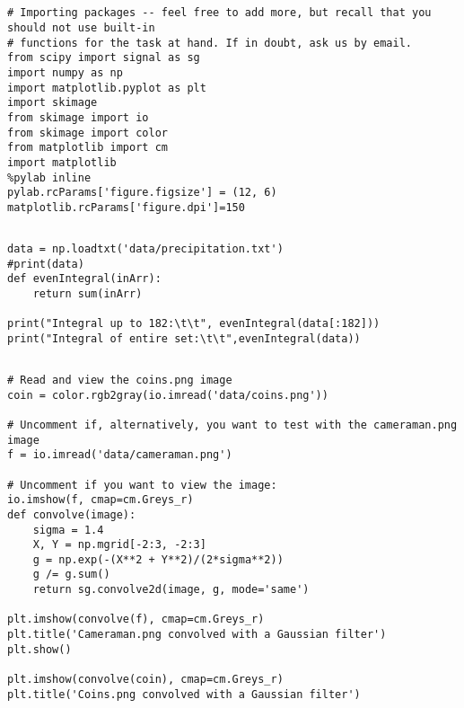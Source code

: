 \subsection{}
\begin{verbatim}
# Importing packages -- feel free to add more, but recall that you should not use built-in 
# functions for the task at hand. If in doubt, ask us by email.
from scipy import signal as sg
import numpy as np
import matplotlib.pyplot as plt
import skimage
from skimage import io
from skimage import color
from matplotlib import cm 
import matplotlib
%pylab inline
pylab.rcParams['figure.figsize'] = (12, 6)
matplotlib.rcParams['figure.dpi']=150
\end{verbatim}

\subsection{}
\begin{verbatim}
data = np.loadtxt('data/precipitation.txt')
#print(data)
def evenIntegral(inArr):
    return sum(inArr)

print("Integral up to 182:\t\t", evenIntegral(data[:182]))
print("Integral of entire set:\t\t",evenIntegral(data))
\end{verbatim}

\subsection{}
\begin{verbatim}
# Read and view the coins.png image
coin = color.rgb2gray(io.imread('data/coins.png'))

# Uncomment if, alternatively, you want to test with the cameraman.png image
f = io.imread('data/cameraman.png')

# Uncomment if you want to view the image:
io.imshow(f, cmap=cm.Greys_r) 
def convolve(image):
    sigma = 1.4
    X, Y = np.mgrid[-2:3, -2:3]
    g = np.exp(-(X**2 + Y**2)/(2*sigma**2))
    g /= g.sum()
    return sg.convolve2d(image, g, mode='same')
    
plt.imshow(convolve(f), cmap=cm.Greys_r)
plt.title('Cameraman.png convolved with a Gaussian filter')
plt.show()

plt.imshow(convolve(coin), cmap=cm.Greys_r)
plt.title('Coins.png convolved with a Gaussian filter')
\end{verbatim}

